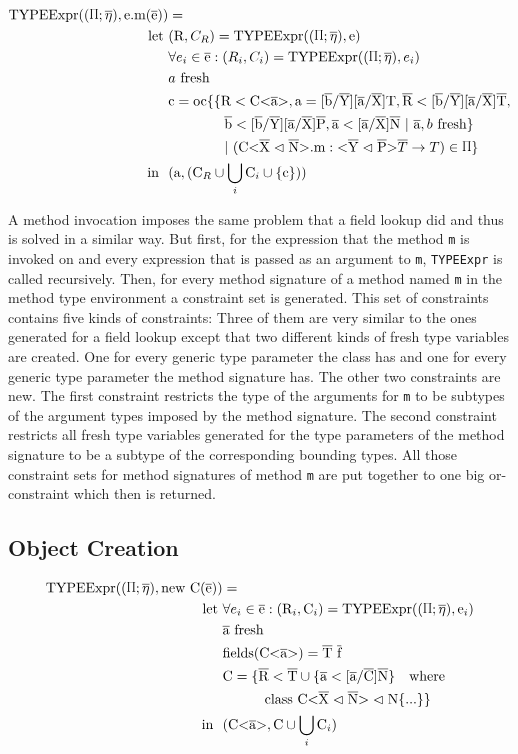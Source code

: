 \begin{align*}
    \texpr{\text{e.m}( \ot{e} )} &= \\
    \text{let} \ &( \text{R}, C_R ) = \texpr{\text{e}} \\
    &\forall{e_i} \in \ot{e} : ( R_i, C_i ) = \texpr{e_i} \\
    &\fresh{a} \\
    &\text{c} = \text{oc} \{ \{ \text{R} < \text{C<} \ot{a} \text{>}, \text{a} = \tsxsnd{b}{Y}{a}{X}{T}, \ot{R} < \tsxsnsd{b}{Y}{a}{X}{T}, \\
    & \quad \quad \quad \quad \ot{b} < \tsxsnsd{b}{Y}{a}{X}{P}, \ot{a} < \tsxsns{a}{X}{N} \ | \ \ot{a}, \fresh{b} \} \\
    & \quad \quad \quad \quad | \ ( \cm : \yp \oto{T} ) \in \sprod{0.7} \}\\
    \text{in} \ \ & (\text{a}, (\text{C}_R \cup \bigcup_{i} \text{C}_i \cup \{ \text{c} \} ))
\end{align*}

A method invocation imposes the same problem that a field lookup did and thus is solved in a similar way. But first, for the
expression that the method \verb|m| is invoked on and every expression that is passed as an argument to \verb|m|, \verb|TYPEExpr|
is called recursively. Then, for every method signature of a method named \verb|m| in the method type environment a constraint
set is generated. This set of constraints contains five kinds of constraints: Three of them are very similar to the ones generated for a
field lookup except that two different kinds of fresh type variables are created. One for every generic type parameter the class has and
one for every generic type parameter the method signature has. The other two constraints are new. The first constraint restricts the type of the arguments for \verb|m| to be subtypes of the
argument types imposed by the method signature. The second constraint restricts all fresh type variables generated for the type parameters
of the method signature to be a subtype of the corresponding bounding types. All those constraint sets for method signatures of method \verb|m| are put together to one big or-constraint which then is returned.

\subsection{Object Creation}

\begin{align*}
    \texpr{\text{new} \ \text{C}(\ot{e})} &=\\
    \text{let} \ & \forall{e_i} \in \ot{e} : (\text{R}_i, \text{C}_i) = \texpr{\text{e}_i}\\
    & \fresh{\ot{a}}\\
    & \text{fields}(\nvt{C}{a}) = \ot{T} \ \ot{f}\\
    & \text{C} = \{ \ot{R} < \ot{T} \cup \{ \ot{a} < \tsxsns{a}{C}{N} \} \quad \text{where} \\
    & \quad \quad \quad \classheader \{ ... \} \}\\
    \text{in} \ \ & ( \nvt{C}{a}, \text{C} \cup \bigcup_{i} \text{C}_i )
\end{align*}

